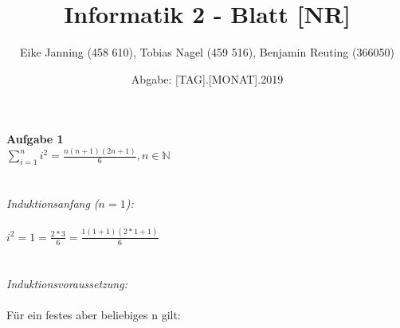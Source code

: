 \documentclass[11pt]{article}
\title{Informatik 2 - Blatt [NR]}
\author{Eike Janning (458 610), Tobias Nagel (459 516), Benjamin Reuting (366050)}
\date{Abgabe: [TAG].[MONAT].2019}
\begin{document}
\maketitle

\textbf{Aufgabe 1}\\

$\displaystyle\sum_{i=1}^{n} i^2 = \frac{n(n+1)(2n+1)}{6}, n\in\mathbb{N}$
\\\\\\
\textit{Induktionsanfang ($n=1$):}\\\\
$i^2 = 1 = \frac{2*3}{6} = \frac{1(1+1)(2*1+1)}{6}$
\\\\\\
\textit{Induktionsvoraussetzung:}\\\\
Für ein festes aber beliebiges n gilt:
\end{document}
